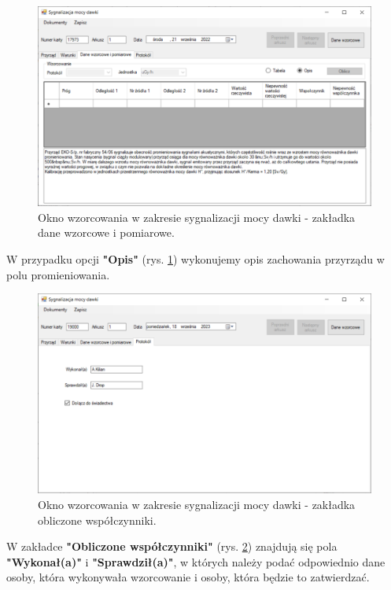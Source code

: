 		\begin{figure}[htb]
		\centering
		\includegraphics[width=\columnwidth]{obrazki/Wzorcowanie/syg_mocy_dawki/dane2.png}
		\caption{Okno wzorcowania w zakresie sygnalizacji mocy dawki - zakładka dane wzorcowe i pomiarowe.}
		\label{sygMocyDane2}
	\end{figure}

W przypadku opcji \textbf{"Opis"} (rys. \ref{sygMocyDane2}) wykonujemy opis zachowania przyrządu w polu promieniowania.
	
	\begin{figure}[htb]
		\centering
		\includegraphics[width=\columnwidth]{obrazki/Wzorcowanie/syg_mocy_dawki/wspolczynniki.png}
		\caption{Okno wzorcowania w zakresie sygnalizacji mocy dawki - zakładka obliczone współczynniki.}
		\label{sygMocyWspolczynniki}
	\end{figure}
	
	W zakładce \textbf{"Obliczone współczynniki"} (rys. \ref{sygMocyWspolczynniki}) znajdują się pola \textbf{"Wykonał(a)"} i \textbf{"Sprawdził(a)"}, w których należy podać odpowiednio dane osoby, która wykonywała wzorcowanie i osoby, która będzie to zatwierdzać. 
	
